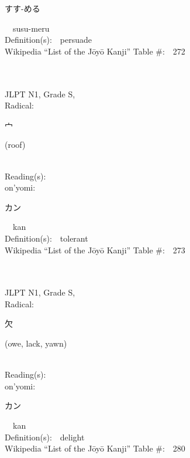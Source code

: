 \begin{multicols}{2}
{\hspace*{2em}}{\begin{CJK}{UTF8}{min} すす-める \end{CJK}}\ \ susu-meru\ \ \\
Definition(s):\ \ persuade \\
Wikipedia ``List of the J\=oy\=o Kanji'' Table \#:\ \ 272 \\
\ \ \\
{\fontsize{34pt}{40pt}  }\ \ \\
{JLPT N1, Grade S, \\Radical:\ \ {\begin{CJK}{UTF8}{min} 宀 \end{CJK}} (roof) } \\
Reading(s):\ \ \\
{\hspace*{1em}}on'yomi:\ \ \\
{\hspace*{2em}}{\begin{CJK}{UTF8}{min} カン \end{CJK}}\ \ kan\ \ \\
Definition(s):\ \ tolerant \\
Wikipedia ``List of the J\=oy\=o Kanji'' Table \#:\ \ 273 \\
\ \ \\
{\fontsize{34pt}{40pt}  }\ \ \\
{JLPT N1, Grade S, \\Radical:\ \ {\begin{CJK}{UTF8}{min} 欠 \end{CJK}} (owe, lack, yawn) } \\
Reading(s):\ \ \\
{\hspace*{1em}}on'yomi:\ \ \\
{\hspace*{2em}}{\begin{CJK}{UTF8}{min} カン \end{CJK}}\ \ kan\ \ \\
Definition(s):\ \ delight \\
Wikipedia ``List of the J\=oy\=o Kanji'' Table \#:\ \ 280 \\
\ \ \\
{\fontsize{34pt}{40pt}  }\ \ \\

\end{multicols}
